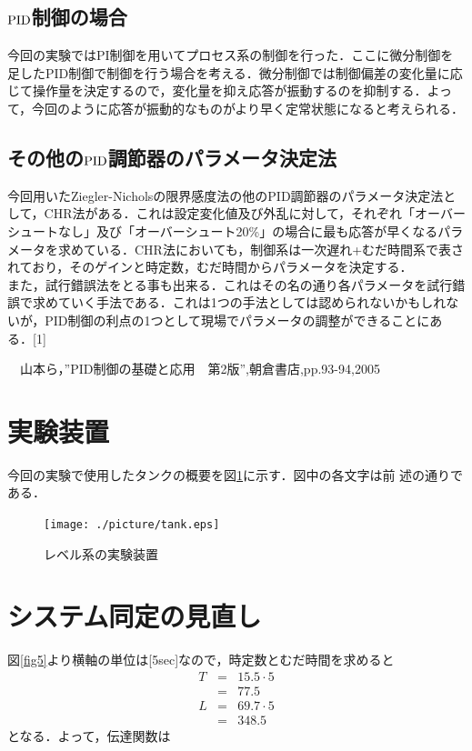 \documentclass[11pt,a4paper]{jsarticle}
\begin{document}
\subsection{$\rm{PID}$制御の場合}
今回の実験ではPI制御を用いてプロセス系の制御を行った．ここに微分制御を足したPID制御で制御を行う場合を考える．微分制御では制御偏差の変化量に応じて操作量を決定するので，変化量を抑え応答が振動するのを抑制する．よって，今回のように応答が振動的なものがより早く定常状態になると考えられる．

\subsection{その他の$\rm{PID}$調節器のパラメータ決定法}
今回用いたZiegler-Nicholsの限界感度法の他のPID調節器のパラメータ決定法として，CHR法がある．これは設定変化値及び外乱に対して，それぞれ「オーバーシュートなし」及び「オーバーシュート20\%」の場合に最も応答が早くなるパラメータを求めている．CHR法においても，制御系は一次遅れ+むだ時間系で表されており，そのゲインと時定数，むだ時間からパラメータを決定する． \\
また，試行錯誤法をとる事も出来る．これはその名の通り各パラメータを試行錯誤で求めていく手法である．これは1つの手法としては認められないかもしれないが，PID制御の利点の1つとして現場でパラメータの調整ができることにある．[1]


\begin{thebibliography}{1}
 \bibitem[1]　山本ら，”PID制御の基礎と応用　第2版”,朝倉書店,pp.93-94,2005
\end{thebibliography}

\newpage
\setcounter{page}{1}
\pagestyle{fancy}
\renewcommand{\headrulewidth}{0.0pt}
\lhead{}
\cfoot{}

\section{実験装置}
今回の実験で使用したタンクの概要を図\ref{fig14}に示す．図中の各文字は前
述の通りである．
\begin{figure}[b]
 \begin{center}
  \texttt{[image: ./picture/tank.eps]}
  \caption{レベル系の実験装置}
  \label{fig14}
 \end{center}
\end{figure}


\section{システム同定の見直し}
図\ref{fig5}より横軸の単位は[5sec]なので，時定数とむだ時間を求めると
\begin{eqnarray*}
T & = & 15.5 \cdot 5 \\
  & = & 77.5 \\
L & = & 69.7 \cdot 5 \\
  & = & 348.5
\end{eqnarray*}
となる．よって，伝達関数は
\end{document}
